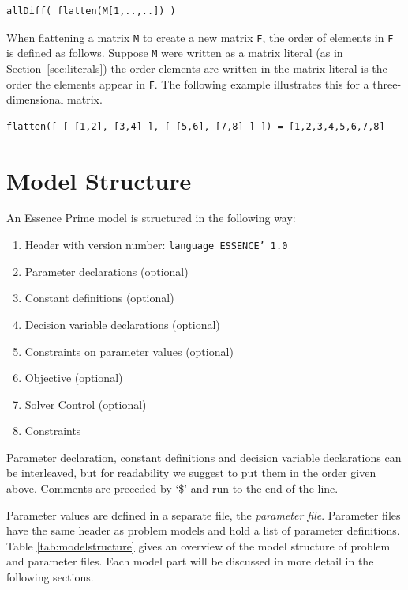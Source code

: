 \documentclass[a4paper]{article}
\newcommand{\eprime}{{\sc Essence Prime}\xspace}
\begin{document}
\begin{verbatim}
allDiff( flatten(M[1,..,..]) )
\end{verbatim}

When flattening a matrix \texttt{M} to create a new matrix \texttt{F}, the order
of elements in \texttt{F} is defined as follows. Suppose \texttt{M} were written as
a matrix literal (as in Section~\ref{sec:literals}) the order elements are written
in the matrix literal is the order the elements appear in \texttt{F}. The following
example illustrates this for a three-dimensional matrix. 

\begin{verbatim}
flatten([ [ [1,2], [3,4] ], [ [5,6], [7,8] ] ]) = [1,2,3,4,5,6,7,8]
\end{verbatim}

\section{Model Structure}

An \eprime model is structured in the following way:

\begin{enumerate}
\item Header with version number: {\tt  language ESSENCE' 1.0} 
\item Parameter declarations (optional)
\item Constant definitions (optional)
\item Decision variable declarations (optional)
\item Constraints on parameter values (optional)
\item Objective (optional)
\item Solver Control (optional)
\item Constraints
\end{enumerate}


Parameter declaration, constant definitions and decision variable 
declarations can be interleaved, but for readability we suggest to put them in the 
order given above. Comments are preceded by `\$' and run to the end of the line.

Parameter values are defined in a separate file, the 
{\em parameter file}. Parameter files have the same header 
as problem models and hold a list of parameter definitions.
Table \ref{tab:modelstructure} gives an overview of the model
structure of problem and parameter files.
Each model part will be discussed in more detail in the following sections.
\end{document}
